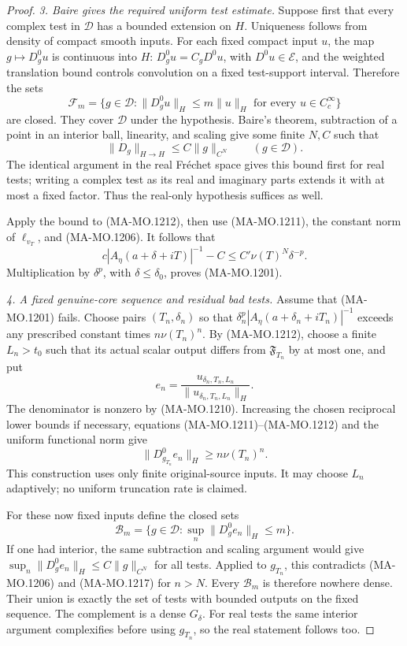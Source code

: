 \begin{proof}
\emph{3. Baire gives the required uniform test estimate.}
Suppose first that every complex test in $\mathcal D$ has
a bounded extension on $H$.  Uniqueness follows from density
of compact smooth inputs.  For each fixed compact input $u$,
the map $g\mapsto D_g^0u$ is continuous into $H$:
$D_g^0u=C_gD^0u$, with $D^0u\in\mathcal E$, and the
weighted translation bound controls convolution on a fixed
test-support interval.  Therefore the sets
\[
 \mathcal F_m=\{g\in\mathcal D:
      \|D_g^0u\|_H\le m\|u\|_H
                 \text{ for every }u\in C_c^\infty\}
 \tag{MA-MO.1213}
\]
are closed.  They cover $\mathcal D$ under the hypothesis.
Baire's theorem, subtraction of a point in an interior ball,
linearity, and scaling give some finite $N,C$ such that
\[
                \|D_g\|_{H\to H}\le C\|g\|_{C^N}
                              \qquad(g\in\mathcal D).
 \tag{MA-MO.1214}
\]
The identical argument in the real Fr\'echet space gives this
bound first for real tests; writing a complex test as its real
and imaginary parts extends it with at most a fixed factor.
Thus the real-only hypothesis suffices as well.

Apply the bound to (MA-MO.1212), then use (MA-MO.1211), the
constant norm of $\ell_{v_T}$, and (MA-MO.1206).  It follows that
\[
 c|A_\eta(a+\delta+iT)|^{-1}-C
      \le C'\nu(T)^N\delta^{-p}.
 \tag{MA-MO.1215}
\]
Multiplication by $\delta^p$, with $\delta\le\delta_0$,
proves (MA-MO.1201).

\emph{4. A fixed genuine-core sequence and residual bad tests.}
Assume that (MA-MO.1201) fails.  Choose pairs $(T_n,\delta_n)$
so that $\delta_n^p|A_\eta(a+\delta_n+iT_n)|^{-1}$ exceeds
any prescribed constant times $n\nu(T_n)^n$.
By (MA-MO.1212), choose a finite $L_n>t_0$ such that its
actual scalar output differs from $\mathfrak F_{T_n}$ by
at most one, and put
\[
 e_n=\frac{u_{\delta_n,T_n,L_n}}
              {\|u_{\delta_n,T_n,L_n}\|_H}.
 \tag{MA-MO.1216}
\]
The denominator is nonzero by (MA-MO.1210).  Increasing the
chosen reciprocal lower bounds if necessary, equations
(MA-MO.1211)--(MA-MO.1212) and the uniform functional norm give
\[
                  \|D_{g_{T_n}}^0e_n\|_H
                                    \ge n\nu(T_n)^n.
 \tag{MA-MO.1217}
\]
This construction uses only finite original-source inputs.
It may choose $L_n$ adaptively; no uniform truncation rate is claimed.

For these now fixed inputs define the closed sets
\[
 \mathcal B_m=\{g\in\mathcal D:
                    \sup_n\|D_g^0e_n\|_H\le m\}.
 \tag{MA-MO.1218}
\]
If one had interior, the same subtraction and scaling argument
would give $\sup_n\|D_g^0e_n\|_H\le C\|g\|_{C^N}$ for all
tests.  Applied to $g_{T_n}$, this contradicts
(MA-MO.1206) and (MA-MO.1217) for $n>N$.
Every $\mathcal B_m$ is therefore nowhere dense.
Their union is exactly the set of tests with bounded outputs
on the fixed sequence.  The complement is a dense $G_\delta$.
For real tests the same interior argument complexifies before
using $g_{T_n}$, so the real statement follows too.


\end{proof}
